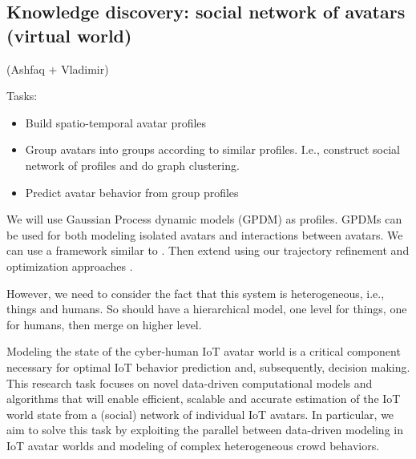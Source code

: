 \subsection{Knowledge discovery: social network of avatars (virtual world)}
(Ashfaq + Vladimir)

Tasks:
\begin{itemize}
	\item Build spatio-temporal avatar profiles
	\item Group avatars into groups according to similar profiles. I.e., construct social network of profiles and do graph clustering.
	\item Predict avatar behavior from group profiles
\end{itemize}


We will use Gaussian Process dynamic models (GPDM) as profiles. GPDMs can be used for both modeling isolated avatars and interactions between avatars.  We can use a framework similar to \cite{Shen2015-jr,Shen2015-ft,Shen2012-vi}.  Then extend using our trajectory refinement and optimization approaches \cite{yoon2016}.

However, we need to consider the fact that this system is heterogeneous, i.e., things and humans.  So should have a hierarchical model, one level for things, one for humans, then merge on higher level.



Modeling the state of the cyber-human IoT avatar world is a critical component necessary for optimal IoT behavior prediction and, subsequently, decision making.  This research task focuses on novel data-driven computational models and algorithms that will enable efficient, scalable and accurate estimation of the IoT world state from a (social) network of individual IoT avatars.  In particular, we aim to solve this task by exploiting the parallel between data-driven modeling in IoT avatar worlds and modeling of complex heterogeneous crowd behaviors.


